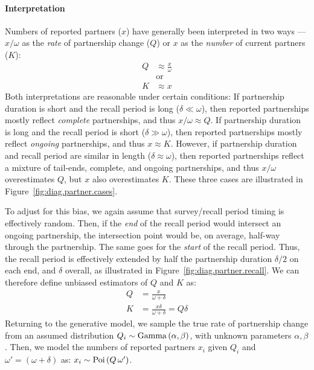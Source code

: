 \paragraph{Interpretation}
Numbers of reported partners ($x$) have generally been interpreted in two ways ---
$x/\omega$ as the \emph{rate} of partnership change ($Q$) or
$x$ as the \emph{number} of current partners ($K$):
\begin{subequations}\label{eq:bQK}
\begin{alignat}{1}
  Q &\approx \frac{x}{\omega} \label{eq:bQ}\\
    &\text{or} \nonumber\\
  K &\approx x \label{eq:bK}
\end{alignat}
\end{subequations}
Both interpretations are reasonable under certain conditions:
If partnership duration is short and the recall period is long ($\delta \ll \omega$),
then reported partnerships mostly reflect \emph{complete} partnerships,
and thus $x/\omega \approx Q$.
If partnership duration is long and the recall period is short ($\delta \gg \omega$),
then reported partnerships mostly reflect \emph{ongoing} partnerships,
and thus $x \approx K$.
However, if partnership duration and recall period are similar in length ($\delta \approx \omega$),
then reported partnerships reflect a mixture of tail-ends, complete, and ongoing partnerships,
and thus $x/\omega$ overestimates $Q$, but $x$ also overestimates $K$.
These three cases are illustrated in Figure~\ref{fig:diag.partner.cases}.
\par
To adjust for this bias, we again assume that survey/recall period timing is effectively random.
Then, if the \emph{end} of the recall period would intersect an ongoing partnership,
the intersection point would be, on average, half-way through the partnership.
The same goes for the \emph{start} of the recall period.
Thus, the recall period is effectively extended by
half the partnership duration $\delta/2$ on each end, and $\delta$ overall,
as illustrated in Figure~\ref{fig:diag.partner.recall}.
We can therefore define unbiased estimators of $Q$ and $K$ as:
\begin{subequations}\label{eq:uQK}
\begin{alignat}{1}
  Q &= \frac{x}{\omega + \delta}\\
  K &= \frac{x \delta}{\omega + \delta} = Q \delta
\end{alignat}
\end{subequations}
Returning to the generative model, we sample the true rate of partnership change
from an assumed distribution $Q_i \sim \mathrm{Gamma}\,(\alpha,\beta)$,
with unknown parameters $\alpha, \beta$.
Then, we model the numbers of reported partners $x_i$
given $Q_i$ and $\omega' = (\omega + \delta)$ as: $x_i \sim \mathrm{Poi}\,(Q\,\omega')$.
